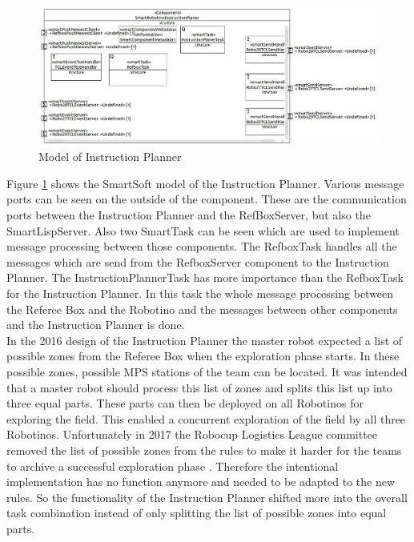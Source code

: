 \begin{figure}[h]
\centering
\includegraphics[scale=0.25]{pic/SmartRobotinoInstructionPlaner.JPG}
\caption{Model of Instruction Planner}
\label{fig:i_overview}
\end{figure}


Figure \ref{fig:i_overview} shows the SmartSoft model of the Instruction Planner. Various message ports can be seen on the outside of the component. These are the communication ports between the Instruction Planner and the RefBoxServer, but also the SmartLispServer. Also two SmartTask can be seen which are used to implement message processing between those components. The RefboxTask handles all the messages which are send from the RefboxServer component to the Instruction Planner. The InstructionPlannerTask has more importance than the RefboxTask for the Instruction Planner. In this task the whole message processing between the Referee Box and the Robotino and the messages between other components and the Instruction Planner is done. \\


In the 2016 design of the Instruction Planner the master robot expected a list of possible zones from the Referee Box when the exploration phase starts. In these possible zones, possible MPS stations of the team can be located. It was intended that a master robot should process this list of zones and splits this list up into three equal parts. These parts can then be deployed on all Robotinos for exploring the field. This enabled a concurrent exploration of the field by all three Robotinos.  Unfortunately in 2017 the Robocup Logistics League committee removed the list of possible zones from the rules to make it harder for the teams to archive a successful exploration phase \cite{RC17}. Therefore the intentional implementation has no function anymore and needed to be adapted to the new rules. So the functionality of the Instruction Planner shifted more into the overall task combination instead of only splitting the list of possible zones into equal parts. \\



